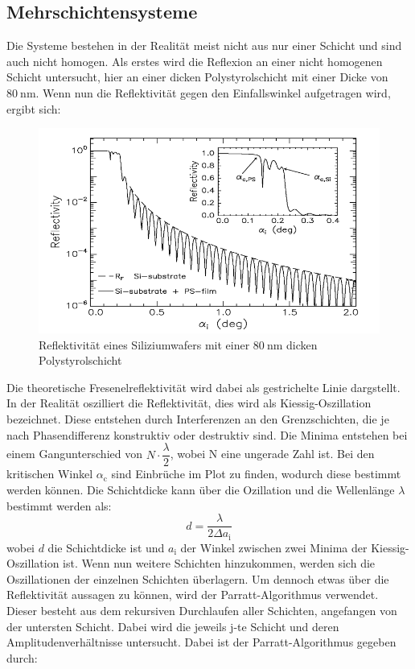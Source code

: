 \subsection{Mehrschichtensysteme}
\label{sec:Mehrschichtensysteme}
Die Systeme bestehen in der Realität meist nicht aus nur einer Schicht und sind auch nicht homogen. Als erstes wird die Reflexion an einer nicht homogenen Schicht untersucht, hier an einer  dicken Polystyrolschicht mit einer Dicke von $\SI{80}{\nano\meter}$. Wenn nun die Reflektivität gegen den Einfallswinkel aufgetragen wird, ergibt sich:
\begin{figure}[h!]
  \label{fig:kiessig}
  \centering
  \includegraphics[scale=0.4]{fig/kiessing.png}
  \caption{Reflektivität eines Siliziumwafers mit einer $\SI{80}{\nano\meter}$ dicken Polystyrolschicht \cite[8]{Anleitung3}}
\end{figure}
\FloatBarrier
\noindent Die theoretische Fresenelreflektivität wird dabei als gestrichelte Linie dargstellt. In der Realität oszilliert die Reflektivität, dies wird als Kiessig-Oszillation bezeichnet. Diese entstehen durch Interferenzen an den Grenzschichten, die je nach Phasendifferenz konstruktiv oder destruktiv sind. Die Minima entstehen bei einem Gangunterschied von $N\cdot\dfrac{\lambda}{2}$, wobei N eine ungerade Zahl ist. Bei den kritischen Winkel $\alpha_\mathrm{c}$ sind Einbrüche im Plot zu finden, wodurch diese bestimmt werden können. Die Schichtdicke kann über die Ozillation und die Wellenlänge $\lambda$ bestimmt werden als:
\begin{equation}
  \label{eqn:Schichtdicke}
d = \dfrac{\lambda}{2\Delta a_\mathrm{i}}
\end{equation}
wobei $d$ die Schichtdicke ist und  $a_\mathrm{i}$ der Winkel zwischen zwei Minima der Kiessig-Oszillation ist.
Wenn nun weitere Schichten hinzukommen, werden sich die Oszillationen der einzelnen Schichten überlagern. Um dennoch etwas über die Reflektivität aussagen zu können, wird der Parratt-Algorithmus verwendet. Dieser besteht aus dem rekursiven Durchlaufen aller Schichten, angefangen von der untersten Schicht. Dabei wird die jeweils j-te Schicht und deren Amplitudenverhältnisse untersucht. Dabei ist der Parratt-Algorithmus gegeben durch:

